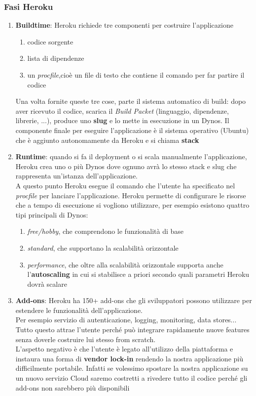 \subsubsection{Fasi Heroku}
\begin{enumerate}
    \item \textbf{Buildtime}: Heroku richiede tre componenti per costruire l'applicazione
    \begin{enumerate}
        \item codice sorgente
        \item lista di dipendenze
        \item un \textit{procfile},cioè un file di testo che contiene il comando per far partire il codice
    \end{enumerate}
    Una volta fornite queste tre cose, parte il sistema automatico di build: dopo aver ricevuto il codice, scarica il \textit{Build Packet} (linguaggio, dipendenze, librerie, ...), produce uno \textbf{slug} e lo mette in esecuzione in un Dynos. Il componente finale per eseguire l’applicazione è il sistema operativo (Ubuntu) che è aggiunto autonomamente da Heroku e si chiama \textbf{stack}

    \item \textbf{Runtime}: quando si fa il deployment o si scala manualmente l’applicazione, Heroku crea uno o più Dynos dove ognuno avrà lo stesso stack e slug che rappresenta un'istanza dell’applicazione.\\
    A questo punto Heroku esegue il comando che l’utente ha specificato nel \textit{procfile} per lanciare l’applicazione. Heroku permette di configurare le risorse che a tempo di esecuzione si vogliono utilizzare, per esempio esistono quattro tipi principali di Dynos:
    \begin{enumerate}
        \item \textit{free/hobby}, che comprendono le funzionalità di base
        \item \textit{standard}, che supportano la scalabilità orizzontale
        \item \textit{performance}, che oltre alla scalabilità orizzontale supporta anche l'\textbf{autoscaling} in cui si stabilisce a priori secondo quali parametri Heroku dovrà scalare
    \end{enumerate}

    \item \textbf{Add-ons}: Heroku ha 150+ add-ons che gli sviluppatori possono utilizzare per estendere le funzionalità dell’applicazione.\\
    Per esempio servizio di autenticazione, logging, monitoring, data stores... Tutto questo attrae l’utente perché può integrare rapidamente nuove features senza doverle costruire lui stesso from scratch.\\
    L’aspetto negativo è che l'utente è legato all’utilizzo della piattaforma e instaura una forma di \textbf{vendor lock-in} rendendo la nostra applicazione più difficilmente portabile. Infatti se volessimo spostare la nostra applicazione su un nuovo servizio Cloud saremo costretti a rivedere tutto il codice perché gli add-ons non sarebbero più disponibili
\end{enumerate}

